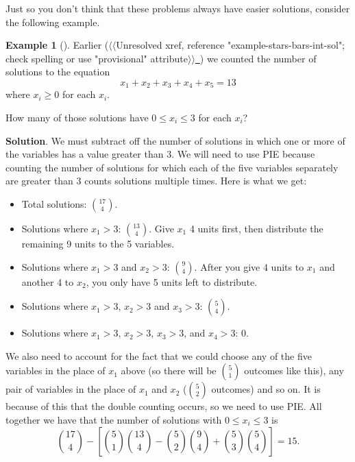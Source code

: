 \documentclass[10pt,]{book}
\theoremstyle{plain}
\theoremstyle{definition}
\theoremstyle{definition}
\newtheorem{example}[theorem]{Example}
\theoremstyle{definition}
\theoremstyle{definition}
\numberwithin{equation}{chapter}
\begin{document}
\hypertarget{p-963}{}%
Just so you don't think that these problems always have easier solutions, consider the following example.%
\begin{example}[]\label{example-13}
\hypertarget{p-964}{}%
Earlier ({$\langle\langle$Unresolved xref, reference "example-stars-bars-int-sol"; check spelling or use "provisional" attribute$\rangle\rangle$}\hyperlink{}{~}) we counted the number of solutions to the equation%
\begin{equation*}
x_1 + x_2 + x_3 + x_4 + x_5 = 13
\end{equation*}
where \(x_i \ge 0\) for each \(x_i\).%
\par
\hypertarget{p-965}{}%
How many of those solutions have \(0 \le x_i \le 3\) for each \(x_i\)?%
\par\smallskip%
\noindent\textbf{Solution}.\hypertarget{solution-80}{}\quad%
\hypertarget{p-966}{}%
We must subtract off the number of solutions in which one or more of the variables has a value greater than 3. We will need to use PIE because counting the number of solutions for which each of the five variables separately are greater than 3 counts solutions multiple times. Here is what we get:%
\par
\hypertarget{p-967}{}%
\leavevmode%
\begin{itemize}[label=\textbullet]
\item{}\hypertarget{p-968}{}%
Total solutions: \({17 \choose 4}\).%
\item{}\hypertarget{p-969}{}%
Solutions where \(x_1 > 3\): \({13 \choose 4}\). Give \(x_1\) 4 units first, then distribute the remaining 9 units to the 5 variables.%
\item{}\hypertarget{p-970}{}%
Solutions where \(x_1 > 3\) and \(x_2 > 3\): \({9 \choose 4}\). After you give 4 units to \(x_1\) and another 4 to \(x_2\), you only have 5 units left to distribute.%
\item{}\hypertarget{p-971}{}%
Solutions where \(x_1 > 3\), \(x_2 > 3\) and \(x_3 > 3\): \({5 \choose 4}\).%
\item{}\hypertarget{p-972}{}%
Solutions where \(x_1 > 3\), \(x_2 > 3\), \(x_3 > 3\), and \(x_4 > 3\): 0.%
\end{itemize}
%
\par
\hypertarget{p-973}{}%
We also need to account for the fact that we could choose any of the five variables in the place of \(x_1\) above (so there will be \({5 \choose 1}\) outcomes like this), any pair of variables in the place of \(x_1\) and \(x_2\) (\({5 \choose 2}\) outcomes) and so on. It is because of this that the double counting occurs, so we need to use PIE. All together we have that the number of solutions with \(0 \le x_i \le 3\) is%
\begin{equation*}
{17 \choose 4} - \left[{5\choose 1}{13 \choose 4} - {5 \choose 2}{9 \choose 4} + {5 \choose 3}{5 \choose 4}\right] = 15.
\end{equation*}
%
\end{example}
\typeout{************************************************}
\typeout{************************************************}
\end{document}
